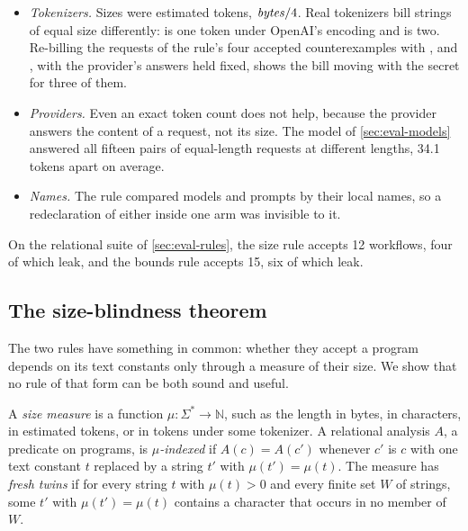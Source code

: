 \begin{itemize}[leftmargin=*]
\item \emph{Tokenizers.} Sizes were estimated tokens, $\mathit{bytes}/4$. Real tokenizers
  bill strings of equal size differently:  is one token under
  OpenAI's  encoding and  is two. Re-billing the
  requests of the rule's four accepted counterexamples with ,
   and , with the provider's answers held fixed,
  shows the bill moving with the secret for three of them.
\item \emph{Providers.} Even an exact token count does not help, because the
  provider answers the content of a request, not its size. The model of
  \cref{sec:eval-models} answered all fifteen pairs of equal-length requests at
  different lengths, 34.1 tokens apart on average.
\item \emph{Names.} The rule compared models and prompts by their local names, so a
  redeclaration of either inside one arm was invisible to it.
\end{itemize}

On the relational suite of \cref{sec:eval-rules}, the size rule accepts 12
workflows, four of which leak, and the bounds rule accepts 15, six of which leak.

\subsection{The size-blindness theorem}\label{sec:theorem}

The two rules have something in common: whether they accept a program depends on
its text constants only through a measure of their size. We show that no rule of
that form can be both sound and useful.

\begin{definition}\label{def:size}
A \emph{size measure} is a function $\mu : \Sigma^* \to \mathbb{N}$, such as the
length in bytes, in characters, in estimated tokens, or in tokens under some
tokenizer. A relational analysis $A$, a predicate on programs, is
\emph{$\mu$-indexed} if $A(c) = A(c')$ whenever $c'$ is $c$ with one text constant
$t$ replaced by a string $t'$ with $\mu(t') = \mu(t)$. The measure has \emph{fresh
twins} if for every string $t$ with $\mu(t) > 0$ and every finite set $W$ of
strings, some $t'$ with $\mu(t') = \mu(t)$ contains a character that occurs in no
member of $W$.
\end{definition}

